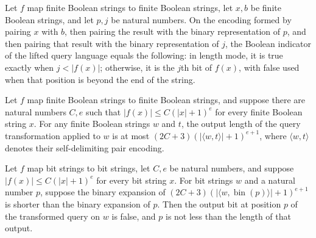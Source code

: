 \begin{lemma}
\label{Complexity.compLift_query}
\leanok
{}
Let $f$ map finite Boolean strings to finite Boolean strings, let $x,b$ be finite
Boolean strings, and let $p,j$ be natural numbers. On the encoding formed by pairing $x$
with $b$, then pairing the result with the binary representation of $p$, and then
pairing that result with the binary representation of $j$, the Boolean indicator of the
lifted query language equals the following: in length mode, it is true exactly when
$j<|f(x)|$; otherwise, it is the $j$th bit of $f(x)$, with false used when that position
is beyond the end of the string.
\end{lemma}

\begin{lemma}
\label{Complexity.compQ_host_cap}
\leanok
{}
Let $f$ map finite Boolean strings to finite Boolean strings, and suppose there are
natural numbers $C,e$ such that $|f(x)|\le C(|x|+1)^e$ for every finite Boolean string
$x$. For any finite Boolean strings $w$ and $t$, the output length of the query
transformation applied to $w$ is at most $(2C+3)(|\langle w,t\rangle|+1)^{e+1}$, where
$\langle w,t\rangle$ denotes their self-delimiting pair encoding.
\end{lemma}

\begin{lemma}
\label{Complexity.compQ_query_overflow}
\leanok
{}
Let $f$ map bit strings to bit strings, let $C,e$ be natural numbers, and suppose
$|f(x)|\le C(|x|+1)^e$ for every bit string $x$. For bit strings $w$ and a natural
number $p$, suppose the binary expansion of $(2C+3)(|\langle
w,\operatorname{bin}(p)\rangle|+1)^{e+1}$ is shorter than the binary expansion of $p$.
Then the output bit at position $p$ of the transformed query on $w$ is false, and $p$ is
not less than the length of that output.
\end{lemma}

